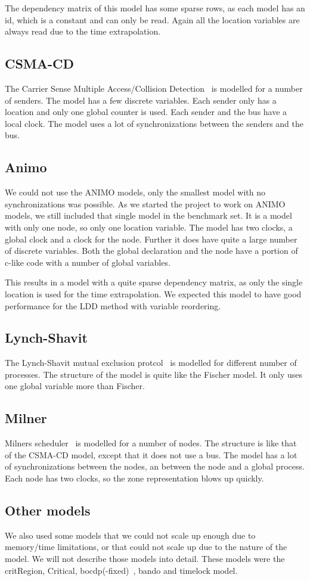 The dependency matrix of this model has some sparse rows, as each model has an id, which is a constant and can only be read. Again all the location variables are always read due to the time extrapolation. 

\subsection{CSMA-CD}
The Carrier Sense Multiple Access/Collision Detection~\cite{kronos} is modelled for a number of senders. The model has a few discrete variables. Each sender only has a location and only one global counter is used. Each sender and the bus have a local clock. The model uses a lot of synchronizations between the senders and the bus.

\subsection{Animo}
We could not use the ANIMO models, only the smallest model with no synchronizations was possible. As we started the project to work on ANIMO models, we still included that single model in the benchmark set. It is a model with only one node, so only one location variable. The model has two clocks, a global clock and a clock for the node.  Further it does have quite a large number of discrete variables. Both the global declaration and the node have a portion of c-like code with a number of global variables. 

This results in a model with a quite sparse dependency matrix, as only the single location is used for the time extrapolation. We expected this model to have good performance for the LDD method with variable reordering.

\subsection{Lynch-Shavit}
The Lynch-Shavit mutual exclusion protcol~\cite{LS} is modelled for different number of processes. The structure of the model is quite like the Fischer model. It only uses one global variable more than Fischer.

\subsection{Milner}
Milners scheduler~\cite{Milner:1989:CC:534666} is modelled for a number of nodes. The structure is like that of the CSMA-CD model, except that it does not use a bus. The model has a lot of synchronizations between the nodes, an between the node and a global process. Each node has two clocks, so the zone representation blows up quickly. 

\subsection{Other models}
We also used some models that we could not scale up enough due to memory/time limitations, or that could not scale up due to the nature of the model. We will not describe those models into detail. These models were the critRegion, Critical, bocdp(-fixed)~\cite{641264}, bando and timelock model.
